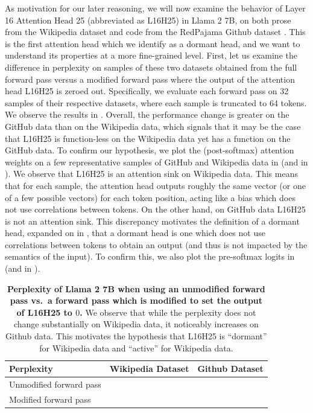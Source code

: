 As motivation for our later reasoning, we will now examine the behavior of Layer 16 Attention Head 25 (abbreviated as L16H25) in Llama 2 7B, on both prose from the Wikipedia dataset \citep{wikidump} and code from the RedPajama Github dataset \citep{together2023redpajama}. This is the first attention head which we identify as a dormant head, and we want to understand its properties at a more fine-grained level. First, let us examine the difference in perplexity on samples of these two datasets obtained from the full forward pass versus a modified forward pass where the output of the attention head L16H25 is zeroed out. Specifically, we evaluate each forward pass on 32 samples of their respective datasets, where each sample is truncated to 64 tokens. We observe the results in . Overall, the performance change is greater on the GitHub data than on the Wikipedia data, which signals that it may be the case that L16H25 is function-less on the Wikipedia data yet has a function on the GitHub data. To confirm our hypothesis, we plot the (post-softmax) attention weights on a few representative samples of GitHub and Wikipedia data in  (and  in ). We observe that L16H25 is an attention sink \citep{xiao2023efficient} on Wikipedia data. This means that for each sample, the attention head outputs roughly the same vector (or one of a few possible vectors) for each token position, acting like a bias which does not use correlations between tokens. On the other hand, on GitHub data L16H25 is not an attention sink. This discrepancy motivates the definition of a dormant head, expanded on in , that a dormant head is one which does not use correlations between tokens to obtain an output (and thus is not impacted by the semantics of the input). To confirm this, we also plot the pre-softmax logits in  (and  in ). 

\begin{table}
    \centering
    \caption{\small \textbf{Perplexity of Llama 2 7B when using an unmodified forward pass vs.~a forward pass which is modified to set the output of L16H25 to \(0\).} We observe that while the perplexity does not change substantially on Wikipedia data, it noticeably increases on Github data. This motivates the hypothesis that L16H25 is ``dormant'' for Wikipedia data and ``active'' for Wikipedia data.}
    \begin{tabular}{@{}lll@{}}
    \toprule
    \textbf{Perplexity}    & Wikipedia Dataset & Github Dataset \\ \midrule
    Unmodified forward pass                  &                   &                \\
    Modified forward pass  &                   &                \\ \bottomrule
    \end{tabular} 
    \label{tab:ppl_wiki_github_l16h25}
\end{table}


